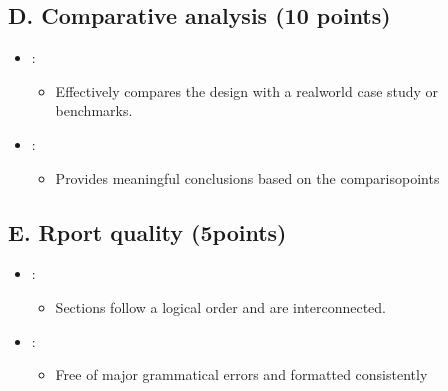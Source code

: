 \documentclass[letterpaper,10pt,english]{jupyterBook}
\begin{document}
\subsection{D. Comparative analysis (10 points)}
\label{\detokenize{ProjectSyllabus:d-comparative-analysis-10-points}}\begin{itemize}
\item {} 
\sphinxAtStartPar
{}:
\begin{itemize}
\item {} 
\sphinxAtStartPar
Effectively compares the design with a real\sphinxhyphen{}world case study or
benchmarks.

\end{itemize}

\item {} 
\sphinxAtStartPar
{}:
\begin{itemize}
\item {} 
\sphinxAtStartPar
Provides meaningful conclusions based on the comparisopoints

\end{itemize}

\end{itemize}


\subsection{E. Rport quality (5\sphinxhyphen{}points)}
\label{\detokenize{ProjectSyllabus:e-rport-quality-5-points}}\begin{itemize}
\item {} 
\sphinxAtStartPar
{}:
\begin{itemize}
\item {} 
\sphinxAtStartPar
Sections follow a logical order and are interconnected.

\end{itemize}

\item {} 
\sphinxAtStartPar
{}:
\begin{itemize}
\item {} 
\sphinxAtStartPar
Free of major grammatical errors and formatted consistently

\end{itemize}

\end{itemize}
\end{document}

